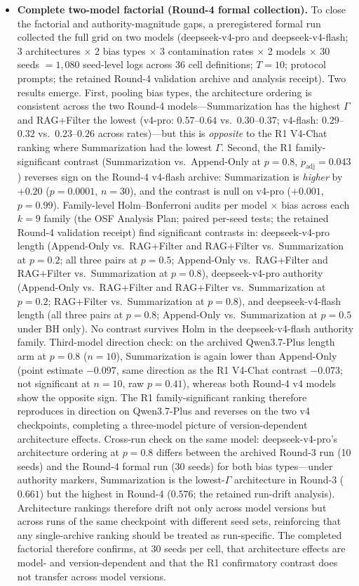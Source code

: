 \documentclass[11pt]{article}
\begin{document}
\begin{itemize}[nosep]
    \item \textbf{Complete two-model factorial (Round-4 formal collection).} To close the factorial and authority-magnitude gaps, a preregistered formal run collected the full grid on two models (deepseek-v4-pro and deepseek-v4-flash; 3 architectures $\times$ 2 bias types $\times$ 3 contamination rates $\times$ 2 models $\times$ 30 seeds $= 1{,}080$ seed-level logs across 36 cell definitions; $T{=}10$; protocol prompts; the retained Round-4 validation archive and analysis receipt). Two results emerge. First, pooling bias types, the architecture ordering is consistent across the two Round-4 models---Summarization has the highest $\Gamma$ and RAG+Filter the lowest (v4-pro: $0.57$--$0.64$ vs.\ $0.30$--$0.37$; v4-flash: $0.29$--$0.32$ vs.\ $0.23$--$0.26$ across rates)---but this is \emph{opposite} to the R1 V4-Chat ranking where Summarization had the lowest $\Gamma$. Second, the R1 family-significant contrast (Summarization vs.\ Append-Only at $p{=}0.8$, $p_{\text{adj}}{=}0.043$) reverses sign on the Round-4 v4-flash archive: Summarization is \emph{higher} by $+0.20$ ($p{=}0.0001$, $n{=}30$), and the contrast is null on v4-pro ($+0.001$, $p{=}0.99$). Family-level Holm--Bonferroni audits per model $\times$ bias across each $k{=}9$ family (the OSF Analysis Plan; paired per-seed tests; the retained Round-4 validation receipt) find significant contrasts in: deepseek-v4-pro length (Append-Only vs.\ RAG+Filter and RAG+Filter vs.\ Summarization at $p{=}0.2$; all three pairs at $p{=}0.5$; Append-Only vs.\ RAG+Filter and RAG+Filter vs.\ Summarization at $p{=}0.8$), deepseek-v4-pro authority (Append-Only vs.\ RAG+Filter and RAG+Filter vs.\ Summarization at $p{=}0.2$; RAG+Filter vs.\ Summarization at $p{=}0.8$), and deepseek-v4-flash length (all three pairs at $p{=}0.8$; Append-Only vs.\ Summarization at $p{=}0.5$ under BH only). No contrast survives Holm in the deepseek-v4-flash authority family. Third-model direction check: on the archived Qwen3.7-Plus length arm at $p{=}0.8$ ($n{=}10$), Summarization is again lower than Append-Only (point estimate $-0.097$, same direction as the R1 V4-Chat contrast $-0.073$; not significant at $n{=}10$, raw $p{=}0.41$), whereas both Round-4 v4 models show the opposite sign. The R1 family-significant ranking therefore reproduces in direction on Qwen3.7-Plus and reverses on the two v4 checkpoints, completing a three-model picture of version-dependent architecture effects. Cross-run check on the same model: deepseek-v4-pro's architecture ordering at $p{=}0.8$ differs between the archived Round-3 run (10 seeds) and the Round-4 formal run (30 seeds) for both bias types---under authority markers, Summarization is the lowest-$\Gamma$ architecture in Round-3 ($0.661$) but the highest in Round-4 ($0.576$; the retained run-drift analysis). Architecture rankings therefore drift not only across model versions but across runs of the same checkpoint with different seed sets, reinforcing that any single-archive ranking should be treated as run-specific. The completed factorial therefore confirms, at 30 seeds per cell, that architecture effects are model- and version-dependent and that the R1 confirmatory contrast does not transfer across model versions.


\end{itemize}
\end{document}
